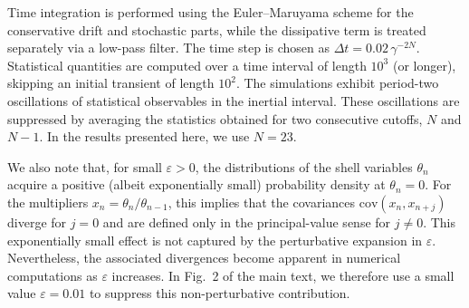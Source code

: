 \documentclass[aps,twocolumn,superscriptaddress]{revtex4-2}
\begin{document}
Time integration is performed using the Euler--Maruyama scheme for the conservative drift and stochastic parts, while the dissipative term is treated separately via a low-pass filter. The time step is chosen as $\Delta t = 0.02\,\gamma^{-2N}$.
Statistical quantities are computed over a time interval of length \(10^3\) (or longer), skipping an initial transient of length \(10^2\). The simulations exhibit period-two oscillations of statistical observables in the inertial interval. These oscillations are suppressed by averaging the statistics obtained for two consecutive cutoffs, \(N\) and \(N-1\). In the results presented here, we use \(N=23\).

We also note that, for small $\varepsilon>0$, the distributions of the shell variables $\theta_n$ acquire a positive (albeit exponentially small) probability density at $\theta_n=0$. For the multipliers $x_n=\theta_n/\theta_{n-1}$, this implies that the covariances $\mathrm{cov}(x_n,x_{n+j})$ diverge for $j=0$ and are defined only in the principal-value sense for $j\neq 0$. This exponentially small effect is not captured by the perturbative expansion in $\varepsilon$. Nevertheless, the associated divergences become apparent in numerical computations as $\varepsilon$ increases. In Fig.~2 of the main text, we therefore use a small value $\varepsilon=0.01$ to suppress this non-perturbative contribution.
\end{document}
